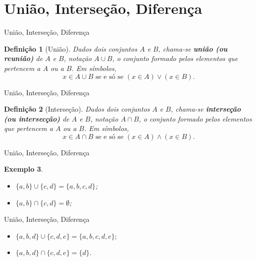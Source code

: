 \documentclass[10pt]{beamer}
\renewcommand{\indent}{\hspace*{2em}}
\theoremstyle{plain}
\newtheorem{defn}{Definição}[section]
\newtheorem{ex}[defn]{Exemplo}
\begin{document}
\section{União, Interseção, Diferença}

\begin{frame}{União, Interseção, Diferença}
\begin{defn}[União]
 \vfill\indent Dados dois conjuntos $A$ e $B$, chama-se \textbf{união (ou reunião)} de $A$ e $B$, notação $A\cup B$, o conjunto formado pelos elementos que pertencem a $A$ ou a $B$. Em símbolos,
 $$x\in A\cup B\mbox{ se e só se }(x\in A)\vee(x\in B).$$
\end{defn}
\end{frame}

\begin{frame}{União, Interseção, Diferença}
\begin{defn}[Interseção]
 \vfill\indent Dados dois conjuntos $A$ e $B$, chama-se \textbf{interseção (ou intersecção)} de $A$ e $B$, notação $A\cap B$, o conjunto formado pelos elementos que pertencem a $A$ ou a $B$. Em símbolos,
 $$x\in A\cap B\mbox{ se e só se }(x\in A)\wedge(x\in B).$$
\end{defn}
\end{frame}

\begin{frame}{União, Interseção, Diferença}
\begin{ex}
\begin{itemize}
    \item $\{a,b\}\cup\{c,d\}=\{a,b,c,d\}$;
    \item $\{a,b\}\cap\{c,d\}=\emptyset$;
\end{itemize} 
\end{ex}
\end{frame}

\begin{frame}{União, Interseção, Diferença}
\begin{block}{}
\begin{itemize}
    \item $\{a,b,d\}\cup\{c,d,e\}=\{a,b,c,d,e\}$;
    \item $\{a,b,d\}\cap\{c,d,e\}=\{d\}$.
\end{itemize} 
\end{block}
\end{frame}
\end{document}
